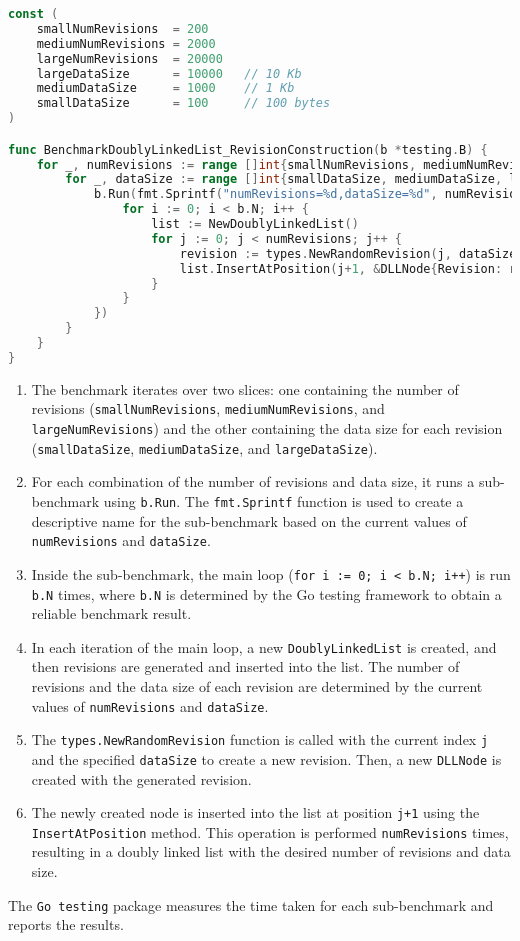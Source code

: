 \begin{lstlisting}[language=go]
const (
	smallNumRevisions  = 200
	mediumNumRevisions = 2000
	largeNumRevisions  = 20000
	largeDataSize      = 10000   // 10 Kb
	mediumDataSize     = 1000    // 1 Kb
	smallDataSize      = 100     // 100 bytes
)

func BenchmarkDoublyLinkedList_RevisionConstruction(b *testing.B) {
	for _, numRevisions := range []int{smallNumRevisions, mediumNumRevisions, largeNumRevisions} {
		for _, dataSize := range []int{smallDataSize, mediumDataSize, largeDataSize} {
			b.Run(fmt.Sprintf("numRevisions=%d,dataSize=%d", numRevisions, dataSize), func(b *testing.B) {
				for i := 0; i < b.N; i++ {
					list := NewDoublyLinkedList()
					for j := 0; j < numRevisions; j++ {
						revision := types.NewRandomRevision(j, dataSize)
						list.InsertAtPosition(j+1, &DLLNode{Revision: revision})
					}
				}
			})
		}
	}
}
\end{lstlisting}

\begin{enumerate}
	\item The benchmark iterates over two slices: one containing the number of revisions (\lstinline{smallNumRevisions}, \lstinline{mediumNumRevisions}, and \lstinline{largeNumRevisions}) and the other containing the data size for each revision (\lstinline{smallDataSize}, \lstinline{mediumDataSize}, and \lstinline{largeDataSize}).
	\item For each combination of the number of revisions and data size, it runs a sub-benchmark using \lstinline{b.Run}. The \lstinline{fmt.Sprintf} function is used to create a descriptive name for the sub-benchmark based on the current values of \lstinline{numRevisions} and \lstinline{dataSize}.
	\item Inside the sub-benchmark, the main loop (\lstinline{for i := 0; i < b.N; i++}) is run \lstinline{b.N} times, where \lstinline{b.N} is determined by the Go testing framework to obtain a reliable benchmark result.
	\item In each iteration of the main loop, a new \lstinline{DoublyLinkedList} is created, and then revisions are generated and inserted into the list. The number of revisions and the data size of each revision are determined by the current values of \lstinline{numRevisions} and \lstinline{dataSize}.
	\item The \lstinline{types.NewRandomRevision} function is called with the current index \lstinline{j} and the specified \lstinline{dataSize} to create a new revision. Then, a new \lstinline{DLLNode} is created with the generated revision.
	\item The newly created node is inserted into the list at position \lstinline{j+1} using the \lstinline{InsertAtPosition} method. This operation is performed \lstinline{numRevisions} times, resulting in a doubly linked list with the desired number of revisions and data size.
\end{enumerate}
The \lstinline{Go testing} package measures the time taken for each sub-benchmark and reports the results.

